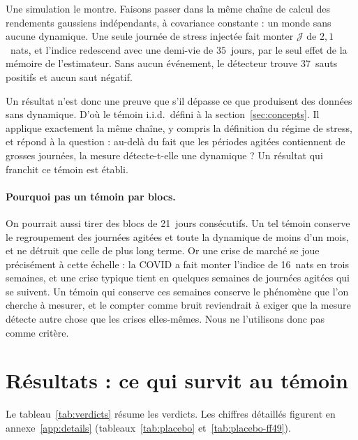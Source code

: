 \documentclass[11pt]{article}
\theoremstyle{definition}
\newcommand{\JJ}{\mathcal{J}}
\begin{document}
Une simulation le montre. Faisons passer dans la même chaîne de calcul des
rendements gaussiens indépendants, à covariance constante : un monde sans
aucune dynamique. Une seule journée de stress injectée fait monter $\JJ$ de
$2{,}1$~nats, et l'indice redescend avec une demi-vie de $35$~jours, par le
seul effet de la mémoire de l'estimateur. Sans aucun événement, le détecteur
trouve $37$~sauts positifs et aucun saut négatif.

Un résultat n'est donc une preuve que s'il dépasse ce que produisent des
données sans dynamique. D'où le témoin i.i.d.\ défini à la
section~\ref{sec:concepts}. Il applique exactement la même chaîne, y compris
la définition du régime de stress, et répond à la question : au-delà du fait
que les périodes agitées contiennent de grosses journées, la mesure
détecte-t-elle une dynamique ? Un résultat qui franchit ce témoin est établi.

\paragraph{Pourquoi pas un témoin par blocs.} On pourrait aussi tirer des blocs
de 21~jours consécutifs. Un tel témoin conserve le regroupement des journées
agitées et toute la dynamique de moins d'un mois, et ne détruit que celle de
plus long terme. Or une crise de marché se joue précisément à cette échelle :
la COVID a fait monter l'indice de 16~nats en trois semaines, et une crise
typique tient en quelques semaines de journées agitées qui se suivent. Un
témoin qui conserve ces semaines conserve le phénomène que l'on cherche à
mesurer, et le compter comme \og bruit \fg{} reviendrait à exiger que la
mesure détecte autre chose que les crises elles-mêmes. Nous ne l'utilisons
donc pas comme critère.

\section{Résultats : ce qui survit au témoin}
\label{sec:resultats}

Le tableau~\ref{tab:verdicts} résume les verdicts. Les chiffres détaillés
figurent en annexe~\ref{app:details} (tableaux~\ref{tab:placebo}
et~\ref{tab:placebo-ff49}).
\end{document}
